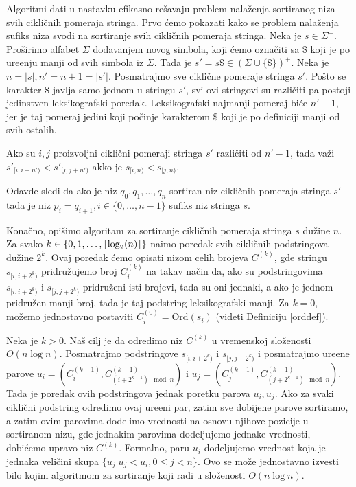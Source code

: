 Algoritmi dati u nastavku efikasno re\v savaju problem nala\v zenja sortiranog niza svih cikli\v cnih pomeraja stringa. Prvo \' cemo pokazati kako se problem nala\v zenja sufiks niza svodi na sortiranje svih cikli\v cnih pomeraja stringa. Neka je $s \in \Sigma^+$. Pro\v sirimo alfabet $\Sigma$ dodavanjem novog simbola, koji \' cemo ozna\v citi sa $\$$ koji je po ure\dj enju manji od svih simbola iz $\Sigma$. Tada je $s' = s\$ \in (\Sigma \cup \{\$\})^+$. Neka je $n = |s|, n' = n+1 = |s'|$. Posmatrajmo sve cikli\v cne pomeraje stringa $s'$. Po\v sto se karakter $\$$ javlja samo jednom u stringu $s'$, svi ovi stringovi su razli\v citi pa postoji jedinstven leksikografski poredak. Leksikografski najmanji pomeraj bi\' ce $n'-1$, jer je taj pomeraj jedini koji po\v cinje karakterom $\$$ koji je po definiciji manji od svih ostalih.

\begin{thm}
Ako su $i,j$ proizvoljni cikli\v cni pomeraji stringa $s'$ razli\v citi od $n'-1$, tada va\v zi $s'_{[i, i+n')} < s'_{[j, j+n')}$ akko je $s_{[i, n)} < s_{[j, n)}$.
\end{thm}

Odavde sledi da ako je niz $q_0, q_1, \ldots, q_n$ sortiran niz cikli\v cnih pomeraja stringa $s'$ tada je niz $p_i = q_{i+1}, i \in \{0, \ldots, n-1\}$ sufiks niz stringa $s$.

\noindent
\begin{minipage}[l]{\textwidth}

\end{minipage}

Kona\v cno, opi\v simo algoritam za sortiranje cikli\v cnih pomeraja stringa $s$ du\v zine $n$. Za svako $k \in \{0, 1, \ldots, \left \lceil \log_2(n) \right \rceil \}$ na\dj imo poredak svih cikli\v cnih podstringova du\v zine $2^k$. Ovaj poredak \' cemo opisati nizom celih brojeva $C^{(k)}$, gde stringu $s_{[i, i+2^k)}$ pridru\v zujemo broj $C^{(k)}_i$ na takav na\v cin da, ako su podstringovima $s_{[i, i+2^k)}$ i $s_{[j, j+2^k)}$ pridru\v zeni isti brojevi, tada su oni jednaki, a ako je jednom pridru\v zen manji broj, tada je taj podstring leksikografski manji. Za $k=0$, mo\v zemo jednostavno postaviti $C^{(0)}_i = \text{Ord}(s_i)$ (videti Definiciju \ref{orddef}).

Neka je $k>0$. Na\v s cilj je da odredimo niz $C^{(k)}$ u vremenskoj slo\v zenosti $O(n \log n)$. Posmatrajmo podstringove $s_{[i, i+2^k)}$ i $s_{[j, j+2^k)}$ i posmatrajmo ure\dj ene parove $u_i = (C^{(k-1)}_i, C^{(k-1)}_{(i+2^{k-1}) \mod n })$ i $u_j = (C^{(k-1)}_j, C^{(k-1)}_{(j+2^{k-1}) \mod n })$. Tada je poredak ovih podstringova jednak poretku parova $u_i, u_j$. Ako za svaki cikli\v cni podstring odredimo ovaj ure\dj eni par, zatim sve dobijene parove sortiramo, a zatim ovim parovima dodelimo vrednosti na osnovu njihove pozicije u sortiranom nizu, gde jednakim parovima dodeljujemo jednake vrednosti, dobi\' cemo upravo niz $C^{(k)}$. Formalno, paru $u_i$ dodeljujemo vrednost koja je jednaka veli\v cini skupa $\{u_j | u_j < u_i, 0 \leq j < n\}$. Ovo se mo\v ze jednostavno izvesti bilo kojim algoritmom za sortiranje koji radi u slo\v zenosti $O(n \log n)$.


